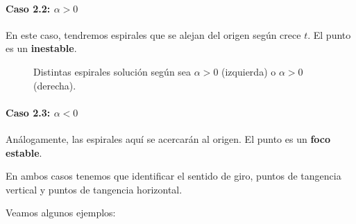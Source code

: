 \paragraph{Caso 2.2: $α>0$} En este caso, tendremos espirales que se alejan del origen según crece $t$. El punto es un \textbf{ inestable}.

\begin{figure}[hbtp]
\caption{Distintas espirales solución según sea $α>0$ (izquierda) o $α>0$ (derecha).}
\label{imgSAEspirales}
\end{figure}

\paragraph{Caso 2.3: $α<0$} Análogamente, las espirales aquí se acercarán al origen. El punto es un \textbf{foco estable}.

En ambos casos tenemos que identificar el sentido de giro, puntos de tangencia vertical y puntos de tangencia horizontal.

Veamos algunos ejemplos:

